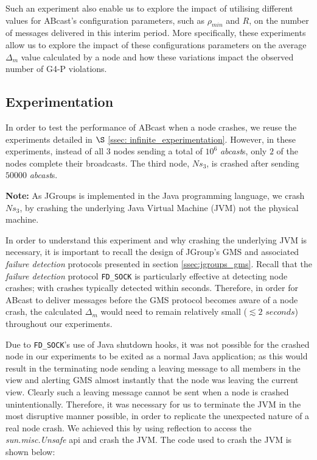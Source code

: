     Such an experiment also enable us to explore the impact of utilising different values for \textsf{ABcast}'s configuration parameters, such as $\rho_{min}$ and $R$, on the number of messages delivered in this interim period.  More specifically, these experiments allow us to explore the impact of these configurations parameters on the average $\Delta_m$ value calculated by a node and how these variations impact the observed number of G4-P violations.  
    
    \subsection{Experimentation}\label{ssec:crash_experiment}
    In order to test the performance of \textsf{ABcast} when a node crashes, we reuse the experiments detailed in $\S$ \ref{ssec: infinite_experimentation}.  However, in these experiments, instead of all $3$ nodes sending a total of $10^6$ \emph{abcast}s, only $2$ of the nodes complete their broadcasts.  The third node, $Ns_3$, is crashed after sending $50000$ \emph{abcast}s.  
    
    \textbf{Note:} As JGroups is implemented in the Java programming language, we crash $Ns_3$, by crashing the underlying Java Virtual Machine (JVM) not the physical machine.  
    
    In order to understand this experiment and why crashing the underlying JVM is necessary, it is important to recall the design of JGroup's GMS and associated \emph{failure detection} protocols presented in section \ref{ssec:jgroups_gms}.  Recall that the \emph{failure detection} protocol \texttt{FD\_SOCK} is particularly effective at detecting node crashes; with crashes typically detected within seconds.  Therefore, in order for \textsf{ABcast} to deliver messages before the GMS protocol becomes aware of a node crash, the calculated $\Delta_m$ would need to remain relatively small ($\lesssim 2$ $seconds$) throughout our experiments.  
    
    Due to \texttt{FD\_SOCK}'s use of Java shutdown hooks, it was not possible for the crashed node in our experiments to be exited as a normal Java application; as this would result in the terminating node sending a leaving message to all members in the view and alerting GMS almost instantly that the node was leaving the current view.  Clearly such a leaving message cannot be sent when a node is crashed unintentionally.  Therefore, it was necessary for us to terminate the JVM in the most disruptive manner possible, in order to replicate the unexpected nature of a real node crash.  We achieved this by using reflection to access the \emph{sun.misc.Unsafe} api and crash the JVM.  The code used to crash the JVM is shown below:
    

